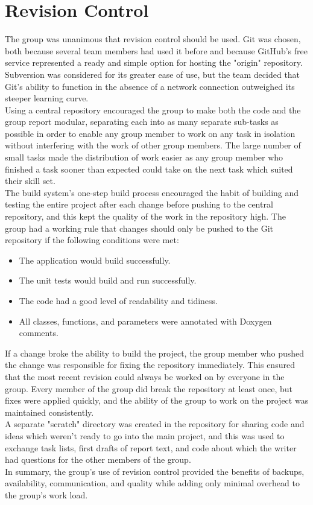 \section{Revision Control}
\label{Revision Control}

The group was unanimous that revision control should be used. Git was chosen, both because several team members had used it before and because GitHub's free service represented a ready and simple option for hosting the "origin" repository.
Subversion was considered for its greater ease of use, but the team decided that Git's ability to function in the absence of a network connection outweighed its steeper learning curve.\\

Using a central repository encouraged the group to make both the code and the group report modular, separating each into as many separate sub-tasks as possible in order to enable any group member to work on any task in isolation without interfering with the work of other group members.
The large number of small tasks made the distribution of work easier as any group member who finished a task sooner than expected could take on the next task which suited their skill set.\\

The build system's one-step build process encouraged the habit of building and testing the entire project after each change before pushing to the central repository, and this kept the quality of the work in the repository high.
The group had a working rule that changes should only be pushed to the Git repository if the following conditions were met:

\begin{itemize}
  \item The application would build successfully.
  \item The unit tests would build and run successfully.
  \item The code had a good level of readability and tidiness.
  \item All classes, functions, and parameters were annotated with Doxygen comments.
\end{itemize}

If a change broke the ability to build the project, the group member who pushed the change was responsible for fixing the repository immediately.
This ensured that the most recent revision could always be worked on by everyone in the group. Every member of the group did break the repository at least once, but fixes were applied quickly, and the ability of the group to work on the project was maintained consistently.\\

A separate "scratch" directory was created in the repository for sharing code and ideas which weren't ready to go into the main project, and this was used to exchange task lists, first drafts of report text, and code about which the writer had questions for the other members of the group.\\

In summary, the group's use of revision control provided the benefits of backups, availability, communication, and quality while adding only minimal overhead to the group's work load.  
